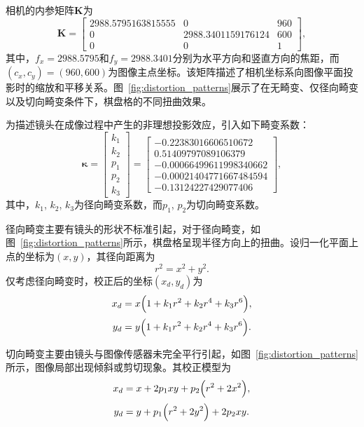 相机的内参矩阵$\mathbf{K}$为
\begin{equation}
	\mathbf{K} =  
	\begin{bmatrix}
		2988.5795163815555 & 0 & 960 \\
		0 & 2988.3401159176124 & 600 \\
		0 & 0 & 1
	\end{bmatrix},
	\label{eq:cameraMatrix}
\end{equation}
其中，$f_x=2988.5795$和$f_y=2988.3401$分别为水平方向和竖直方向的焦距，而$(c_x, c_y)=(960,600)$为图像主点坐标。该矩阵描述了相机坐标系向图像平面投影时的缩放和平移关系。图~\ref{fig:distortion_patterns}展示了在无畸变、仅径向畸变以及切向畸变条件下，棋盘格的不同扭曲效果。


为描述镜头在成像过程中产生的非理想投影效应，引入如下畸变系数：
\begin{equation}
	\boldsymbol{\kappa} = 
	\begin{bmatrix}
		k_1 \\[2pt] k_2 \\[2pt] p_1 \\[2pt] p_2 \\[2pt] k_3
	\end{bmatrix}
	=
	\begin{bmatrix}
		-0.22383016606510672\\[2pt]
		0.51409797089106379\\[2pt]
		-0.00066499611998340662\\[2pt]
		-0.00021404771667484594\\[2pt]
		-0.13124227429077406
	\end{bmatrix},
\end{equation}
其中，$k_1$, $k_2$, $k_3$为径向畸变系数，而$p_1$, $p_2$为切向畸变系数。


径向畸变主要有镜头的形状不标准引起，对于径向畸变，如图~\ref{fig:distortion_patterns}所示，棋盘格呈现半径方向上的扭曲。设归一化平面上点的坐标为$(x,y)$，其径向距离为
\begin{equation}
	r^2 = x^2 + y^2.
\end{equation}
仅考虑径向畸变时，校正后的坐标$(x_d,y_d)$为
\begin{equation}
	\begin{aligned}
		x_{d} &= x\Bigl(1 + k_1r^2 + k_2r^4 + k_3r^6\Bigr),\\[2pt]
		y_{d} &= y\Bigl(1 + k_1r^2 + k_2r^4 + k_3r^6\Bigr).
	\end{aligned}
\end{equation}


切向畸变主要由镜头与图像传感器未完全平行引起，如图~\ref{fig:distortion_patterns}所示，图像局部出现倾斜或剪切现象。其校正模型为
\begin{equation}
	\begin{aligned}
		x_{d} &= x + 2p_1 xy + p_2\Bigl(r^2 + 2x^2\Bigr),\\[2pt]
		y_{d} &= y + p_1\Bigl(r^2 + 2y^2\Bigr) + 2p_2 xy.
	\end{aligned}
\end{equation}

